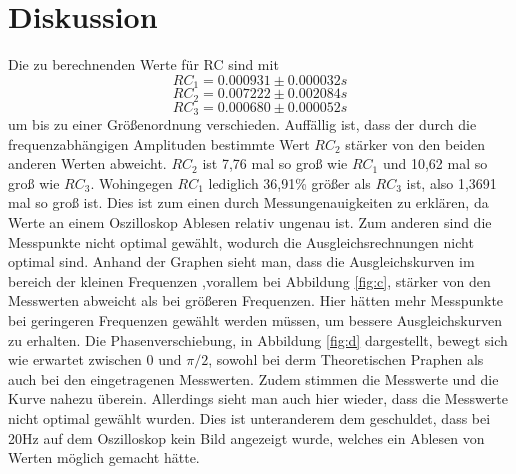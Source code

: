 \section{Diskussion}
\label{sec:Diskussion}
Die zu berechnenden Werte für RC sind mit
\begin{equation*}
    RC_1 = 0.000931 \pm 0.000032s
\end{equation*}
\begin{equation*}
    RC_2 = 0.007222 \pm 0.002084s
\end{equation*}
\begin{equation*}
    RC_3 = 0.000680 \pm 0.000052s
\end{equation*}
um bis zu einer Größenordnung verschieden. Auffällig ist, dass der durch die frequenzabhängigen Amplituden bestimmte Wert $RC_2$ stärker von den beiden 
anderen Werten abweicht. $RC_2$ ist 7,76 mal so groß wie $RC_1$ und 10,62 mal so groß wie $RC_3$. Wohingegen $RC_1$ lediglich 36,91\% größer als 
$RC_3$ ist, also 1,3691 mal so groß ist. Dies ist zum einen durch Messungenauigkeiten zu erklären, da Werte an einem Oszilloskop Ablesen relativ ungenau ist. 
Zum anderen sind die Messpunkte nicht optimal gewählt, wodurch die Ausgleichsrechnungen nicht optimal sind. Anhand der Graphen sieht man, dass 
die Ausgleichskurven im bereich der kleinen Frequenzen ,vorallem bei Abbildung \ref{fig:c}, stärker von den Messwerten abweicht als bei größeren Frequenzen. 
Hier hätten mehr Messpunkte bei geringeren Frequenzen gewählt werden müssen, um bessere Ausgleichskurven zu erhalten.
Die Phasenverschiebung, in Abbildung \ref{fig:d} dargestellt, bewegt sich wie erwartet zwischen 0 und $\pi/2$, sowohl bei derm Theoretischen Praphen als 
auch bei den eingetragenen Messwerten. Zudem stimmen die Messwerte und die Kurve nahezu überein. Allerdings sieht man auch hier wieder, dass die Messwerte nicht 
optimal gewählt wurden. Dies ist unteranderem dem geschuldet, dass bei 20Hz auf dem Oszilloskop kein Bild angezeigt wurde, welches ein Ablesen von Werten 
möglich gemacht hätte.